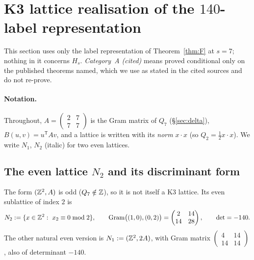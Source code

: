 \section{K3 lattice realisation of the $140$-label representation}\label{sec:k3}
This section uses only the label representation of Theorem~\ref{thm:F} at $s=7$; nothing in it concerns $H_s$. \emph{Category~A (cited)} means proved
conditional only on the published theorems named, which we use as stated in the cited sources and do not re-prove.

\paragraph{Notation.} Throughout, $A=\left(\begin{smallmatrix}2&7\\7&7\end{smallmatrix}\right)$ is the Gram matrix of $Q_7$ (\S\ref{sec:delta}), $B(u,v)=u^{\mathsf T}Av$, and a lattice is written with its \emph{norm} $x\cdot x$ (so $Q_2=\tfrac12x\cdot x$). We write $N_1$, $N_2$ (italic) for two even lattices.

\subsection{The even lattice $N_2$ and its discriminant form}\label{sec:disc}
The form $(\mathbb{Z}^2,A)$ is odd ($Q_7\notin\mathbb{Z}$), so it is not itself a K3 lattice. Its even sublattice of index $2$ is
\[
N_2:=\{x\in\Z^2:\ x_2\equiv0\bmod2\},\qquad \mathrm{Gram}\big((1,0),(0,2)\big)=\begin{pmatrix}2&14\\14&28\end{pmatrix},\qquad\det=-140 .
\]
The other natural even version is $N_1:=(\mathbb{Z}^2,2A)$, with Gram matrix $\left(\begin{smallmatrix}4&14\\14&14\end{smallmatrix}\right)$, also of determinant $-140$.

